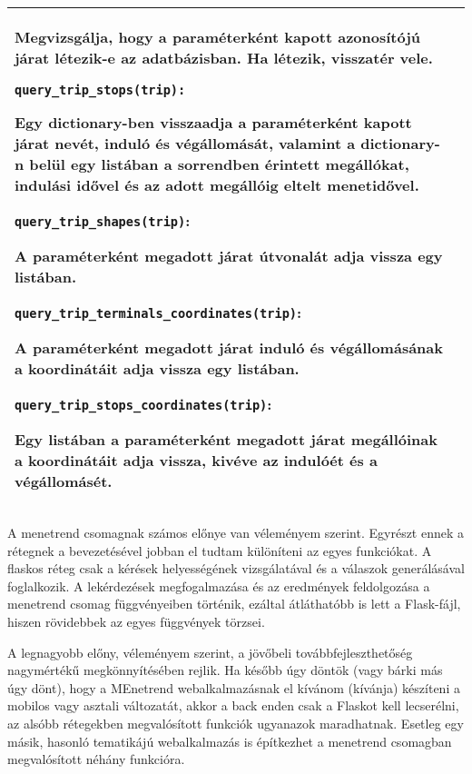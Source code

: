 \begin{longtable}{|p{4.5cm}|p{9cm}|}
Megvizsgálja, hogy a paraméterként kapott azonosítójú járat létezik-e az adatbázisban. Ha létezik, visszatér vele.

\bigskip

\texttt{query\_trip\_stops(trip):}

Egy dictionary-ben visszaadja a paraméterként kapott járat nevét, induló és végállomását, valamint a dictionary-n belül egy listában a sorrendben érintett megállókat, indulási idővel és az adott megállóig eltelt menetidővel.

\bigskip

\texttt{query\_trip\_shapes(trip)}:

A paraméterként megadott járat útvonalát adja vissza egy listában.

\bigskip

\texttt{query\_trip\_terminals\_coordinates(trip)}:

A paraméterként megadott járat induló és végállomásának a koordinátáit adja vissza egy listában.

\bigskip

\texttt{query\_trip\_stops\_coordinates(trip)}:

Egy listában a paraméterként megadott járat megállóinak a koordinátáit adja vissza, kivéve az indulóét és a végállomásét.
\\
\hline
\end{longtable}

A menetrend csomagnak számos előnye van véleményem szerint. Egyrészt ennek a rétegnek a bevezetésével jobban el tudtam különíteni az egyes funkciókat. A flaskos réteg csak a kérések helyességének vizsgálatával és a válaszok generálásával foglalkozik. A lekérdezések megfogalmazása és az eredmények feldolgozása a menetrend csomag függvényeiben történik, ezáltal átláthatóbb is lett a Flask-fájl, hiszen rövidebbek az egyes függvények törzsei.

\newpage

A legnagyobb előny, véleményem szerint, a jövőbeli továbbfejleszthetőség nagymértékű megkönnyítésében rejlik. Ha később úgy döntök (vagy bárki más úgy dönt), hogy a MEnetrend webalkalmazásnak el kívánom (kívánja) készíteni a mobilos vagy asztali változatát, akkor a back enden csak a Flaskot kell lecserélni, az alsóbb rétegekben megvalósított funkciók ugyanazok maradhatnak. Esetleg egy másik, hasonló tematikájú webalkalmazás is építkezhet a menetrend csomagban megvalósított néhány funkcióra.


